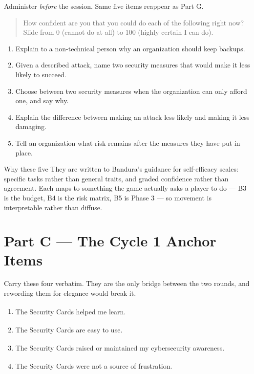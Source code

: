 \documentclass[11pt,letterpaper]{article}
\newcommand{\anchor}{\textsuperscript{\dag}}
\begin{document}
Administer \emph{before} the session. Same five items reappear as Part G.

\begin{quote}\small
How confident are you that you could do each of the following right now?
Slide from 0 (cannot do at all) to 100 (highly certain I can do).
\end{quote}

\begin{enumerate}[label=B\arabic*.]
\item Explain to a non-technical person why an organization should keep backups.
\item Given a described attack, name two security measures that would make it
less likely to succeed.
\item Choose between two security measures when the organization can only afford
one, and say why.
\item Explain the difference between making an attack less likely and making it
less damaging.
\item Tell an organization what risk remains after the measures they have put in
place.
\end{enumerate}

\begin{note}{Why these five}
They are written to Bandura's guidance for self-efficacy scales: specific tasks
rather than general traits, and graded confidence rather than agreement. Each
maps to something the game actually asks a player to do --- B3 is the budget,
B4 is the risk matrix, B5 is Phase 3 --- so movement is interpretable rather
than diffuse.
\end{note}

\section{Part C --- The Cycle 1 Anchor Items}

Carry these four verbatim. They are the only bridge between the two rounds, and
rewording them for elegance would break it.

\begin{enumerate}[label=C\arabic*.]
\item\anchor{} The Security Cards helped me learn.
\item\anchor{} The Security Cards are easy to use.
\item\anchor{} The Security Cards raised or maintained my cybersecurity awareness.
\item\anchor{} The Security Cards were not a source of frustration.
\end{enumerate}
\end{document}

